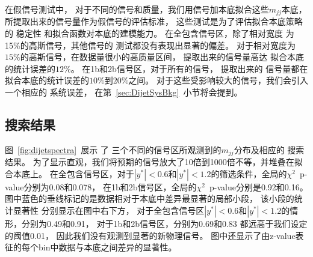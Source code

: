 在假信号测试中，
对于不同的信号和质量，我们用信号加本底拟合这些$m_{jj}$本底，所提取出来的信号量作为假信号的评估标准，
这些测试是为了评估拟合本底策略的
稳定性
和拟合函数对本底的建模能力。
在全包含信号区，除了相对宽度
为15\%的高斯信号，其他信号的
测试都没有表现出显著的偏差。
对于相对宽度为$15\%$的高斯信号，在数据量很小的高质量区间，
提取出来的信号量高达
拟合本底的统计误差的$12\%$。
在1b和2b信号区，对于所有的信号，
提取出来的
信号量都在
拟合本底的统计误差的$10\%$到$20\%$之间。
对于这些受影响较大的信号，我们会引入一个相应的
系统误差，
在第~\ref{sec:DijetSysBkg}~小节将会提到。



\subsection{搜索结果}
\label{sec:DijetMjj4}


图~\ref{fig:dijetspectra}~展示
了
三个不同的信号区所观测到的$m_{jj}$分布及相应的
搜索结果。
为了显示直观，我们将预期的信号放大了10倍到1000倍不等，并堆叠在拟合本底上。
在全包含信号区，对于$|y^*|<0.6$和$|y^*|<1.2$的筛选条件，全局的$\chi^2$~p-value分别为0.08和0.078，
在1b和2b信号区，全局的$\chi^2$~p-value分别是0.92和0.16。
图中蓝色的垂线标记的是数据相对于本底中差异最显著的局部小段，
该小段的统计显著性%
分别显示在图中右下方，
对于全包含信号区$|y^*|<0.6$和$|y^*|<1.2$的情形，分别为0.49和0.91，
对于1b和2b信号区，分别为0.69和0.83
都远高于我们设定的阈值0.01，
因此我们没有观测到显著的新物理信号。
图中还显示了由z-value表征的每个bin中数据与本底之间差异的显著性。



